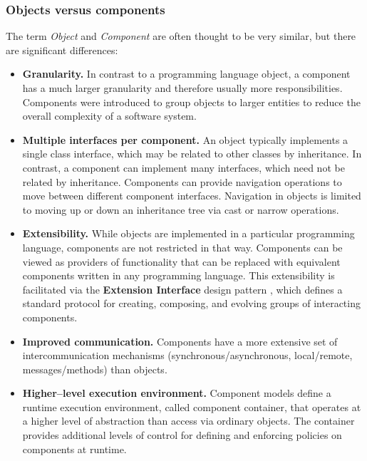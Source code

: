 \subsubsection{Objects versus components}
The term {\it Object} and {\it Component} are often thought to be very similar,
but there are significant differences:
\begin{itemize}
\item {\bf Granularity.}
In contrast to a programming language object, a component has a much larger 
granularity and therefore usually more responsibilities.
Components were introduced to group objects to larger entities to reduce the
overall complexity of a software system. 

\item {\bf Multiple interfaces per component.}
An object typically implements a single class interface, which may be related
to other classes by inheritance.
In contrast, a component can implement many interfaces, which need not be 
related by inheritance.
Components can provide navigation operations to move between different 
component interfaces.
Navigation in objects is limited to moving up or down an inheritance tree
via cast or narrow operations.

\item {\bf Extensibility.}
While objects are implemented in a particular programming language,
components are not restricted in that way.
Components can be viewed as providers of functionality that can be 
replaced with equivalent components written in any programming language.
This extensibility is facilitated via the {\bf Extension Interface} design
pattern \cite{POSA2}, which defines a standard protocol for creating,
composing, and evolving groups of interacting components.

\item {\bf Improved communication.}
Components have a more extensive set of intercommunication mechanisms 
(synchronous/asynchronous, local/remote, messages/methods) 
than objects. 

\item {\bf Higher--level execution environment.}
Component models define a runtime execution environment, called component 
container, that operates at a higher level of abstraction than access via
ordinary objects.
The container provides additional levels of control for defining and
enforcing policies on components at runtime. 
\end{itemize}



